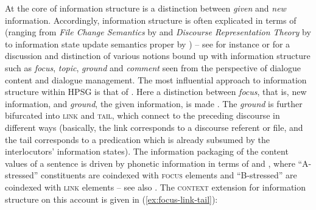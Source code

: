 \documentclass[output=paper
 	        ,biblatex
                ,babelshorthands
                ,newtxmath
                ,draftmode
                ,colorlinks, citecolor=brown
]{langscibook}
\begin{document}
At the core of information structure is a distinction between \emph{given} and \emph{new} information. 
%
Accordingly, information structure is often explicated in terms of  (ranging from \emph{File Change Semantics} by \citealt{Heim:2002} and \emph{Discourse Representation Theory} by \citealt{Kamp:Reyle:1993} to information state update semantics proper by \citealt{Traum:Larsson:2003}) -- see for instance \citet{Krifka:2008} or \citet{Vallduvi2015} for a discussion and distinction of various notions bound up with information structure such as \emph{focus}, \emph{topic}, \emph{ground} and \emph{comment} seen from the perspective of dialogue content and dialogue management.
%
The most influential approach to information structure within HPSG is that of \citet{Engdahl:Vallduvi:1996}.
%
Here a distinction between \emph{focus}, that is, new information, and \emph{ground}, the given information, is made \citep[]{Engdahl:Vallduvi:1996}. 
%
The \emph{ground} is further bifurcated into \textsc{link} and \textsc{tail}, which connect to the preceding discourse in different ways (basically, the link corresponds to a discourse referent or file, and the tail corresponds to a predication which is already subsumed by the interlocutors' information states).
%
The information packaging of the content values of a sentence is driven by phonetic information in terms of  and  \citep[Chapter~6]{Jackendoff:1972}, where \enquote{A-stressed} constituents are coindexed with \textsc{focus} elements and \enquote{B-stressed} are coindexed with \textsc{link} elements -- see also .
%
The \textsc{context} extension for information structure on this account is given in (\ref{ex:focus-link-tail}):
%
\ea \label{ex:focus-link-tail}
\z
\end{document}
